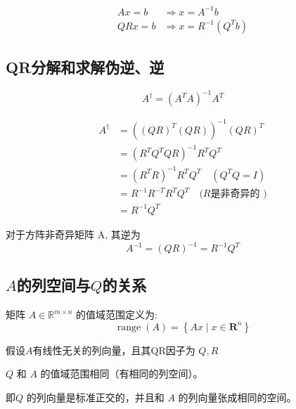\begin{corollary}
    

$$\begin{aligned}
   Ax = b &\Rightarrow x = A^{-1} b \\
QRx = b &\Rightarrow x = R^{-1} \left(Q^Tb\right)
\end{aligned}
$$
\end{corollary}

\subsection{QR分解和求解伪逆、逆}

\begin{definition}
    $$A^{\dagger}=\left(A^{T} A\right)^{-1} A^{T}$$
\end{definition}

\begin{theorem}
    $$
\begin{aligned}
A^{\dagger}&=\left((Q R)^{T}(Q R)\right)^{-1}(Q R)^{T} \\
&=\left(R^{T} Q^{T} Q R\right)^{-1} R^{T} Q^{T} \\
&=\left(R^{T} R\right)^{-1} R^{T} Q^{T} \quad\left(Q^{T} Q=I\right) \\
&=R^{-1} R^{-T} R^{T} Q^{T} \quad(R{\text {是非奇异的 })} \\
 &={R^{-1} Q^{T}}
\end{aligned}
$$
\end{theorem}

\begin{corollary}
    对于方阵非奇异矩阵 $\mathrm{A}$, 其逆为
$$
A^{-1}=(Q R)^{-1}=R^{-1} Q^{T}
$$
\end{corollary}

\subsection{$A$的列空间与$Q$的关系}

矩阵 $A \in \mathbb{R}^{m \times n}$ 的值域范围定义为:
$$
\operatorname{range}(A)=\left\{A x \mid x \in \mathbf{R}^{n}\right\}
$$

\begin{theorem}
    假设$A$有线性无关的列向量，且其QR因子为 $Q, R$

    $Q$ 和 $A$ 的值域范围相同（有相同的列空间）。

\end{theorem}

即$Q$ 的列向量是标准正交的，并且和 $A$ 的列向量张成相同的空间。

